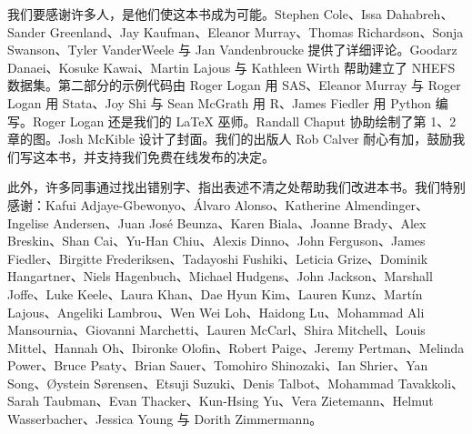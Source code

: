 我们要感谢许多人，是他们使这本书成为可能。Stephen Cole、Issa Dahabreh、Sander Greenland、Jay Kaufman、Eleanor Murray、Thomas Richardson、Sonja Swanson、Tyler VanderWeele 与 Jan Vandenbroucke 提供了详细评论。Goodarz Danaei、Kosuke Kawai、Martin Lajous 与 Kathleen Wirth 帮助建立了 NHEFS 数据集。第二部分的示例代码由 Roger Logan 用 SAS、Eleanor Murray 与 Roger Logan 用 Stata、Joy Shi 与 Sean McGrath 用 R、James Fiedler 用 Python 编写。Roger Logan 还是我们的 LaTeX 巫师。Randall Chaput 协助绘制了第 1、2 章的图。Josh McKible 设计了封面。我们的出版人 Rob Calver 耐心有加，鼓励我们写这本书，并支持我们免费在线发布的决定。

此外，许多同事通过找出错别字、指出表述不清之处帮助我们改进本书。我们特别感谢：Kafui Adjaye-Gbewonyo、Álvaro Alonso、Katherine Almendinger、Ingelise Andersen、Juan José Beunza、Karen Biala、Joanne Brady、Alex Breskin、Shan Cai、Yu-Han Chiu、Alexis Dinno、John Ferguson、James Fiedler、Birgitte Frederiksen、Tadayoshi Fushiki、Leticia Grize、Dominik Hangartner、Niels Hagenbuch、Michael Hudgens、John Jackson、Marshall Joffe、Luke Keele、Laura Khan、Dae Hyun Kim、Lauren Kunz、Martín Lajous、Angeliki Lambrou、Wen Wei Loh、Haidong Lu、Mohammad Ali Mansournia、Giovanni Marchetti、Lauren McCarl、Shira Mitchell、Louis Mittel、Hannah Oh、Ibironke Olofin、Robert Paige、Jeremy Pertman、Melinda Power、Bruce Psaty、Brian Sauer、Tomohiro Shinozaki、Ian Shrier、Yan Song、Øystein Sørensen、Etsuji Suzuki、Denis Talbot、Mohammad Tavakkoli、Sarah Taubman、Evan Thacker、Kun-Hsing Yu、Vera Zietemann、Helmut Wasserbacher、Jessica Young 与 Dorith Zimmermann。

